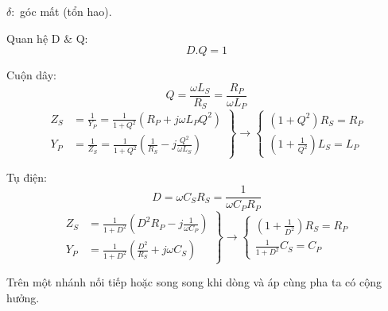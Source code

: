 $\delta:$ góc mất (tổn hao).

Quan hệ D $\&$ Q: 
\begin{equation}
    D.Q=1
\end{equation}

\textbf{}

Cuộn dây:
\begin{equation}
    Q = \frac{\omega L_S}{R_S} = \frac{R_P}{\omega L_P}
\end{equation}
\begin{equation}
    \left.
        \begin{aligned}
            Z_S &= \frac{1}{Y_P} = \frac{1}{1+Q^2}(R_P + j\omega L_P Q^2) \\
            Y_P &= \frac{1}{Z_S} = \frac{1}{1+Q^2}\left(\frac{1}{R_S} - j\frac{Q^2}{\omega L_S}\right)
        \end{aligned}
    \right\} \to 
    \left\{
        \begin {aligned}
            (1+Q^2) R_S = R_P \\
            \left( 1 + \frac{1}{Q^2} \right)L_S = L_P
        \end{aligned}
    \right.
\end{equation}

Tụ điện:
\begin{equation}
    D = \omega C_S R_S = \frac{1}{\omega C_P R_P}
\end{equation}
\begin{equation}
    \left.
        \begin{aligned}
            Z_S &= \frac{1}{1+D^2}\left(D^2 R_P - j\frac{1}{\omega C_P} \right) \\
            Y_P &= \frac{1}{1+D^2}\left(\frac{D^2}{R_S} + j\omega C_S\right)
        \end{aligned}
    \right\} \to 
    \left\{
        \begin {aligned}
            \left(1+\frac{1}{D^2} \right) R_S = R_P \\
            \frac{1}{1+D^2} C_S = C_P
        \end{aligned}
    \right.
\end{equation}


Trên một nhánh nối tiếp hoặc song song khi dòng và áp cùng pha ta có cộng hưởng.

